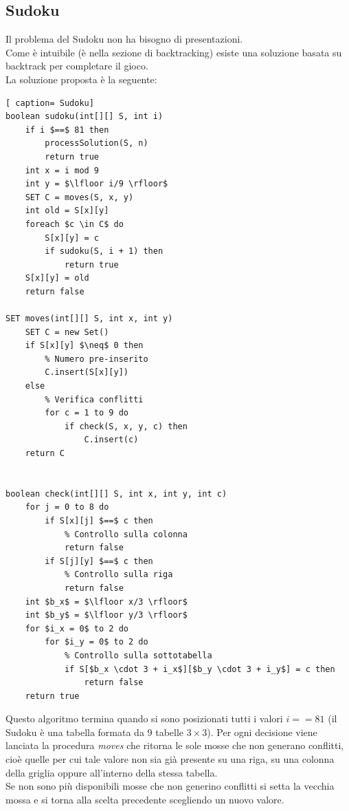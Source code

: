 \documentclass[../cheatSheetAlgoritmi.tex]{subfiles}
\begin{document}
\subsection{Sudoku}
Il problema del Sudoku non ha bisogno di presentazioni. \\
Come è intuibile (è nella sezione di backtracking) esiste una soluzione basata su backtrack per completare il gioco. \\
La soluzione proposta è la seguente: 
 \begin{lstlisting}[ caption= Sudoku]
boolean sudoku(int[][] S, int i)
	if i $==$ 81 then
		processSolution(S, n)
		return true
	int x = i mod 9
	int y = $\lfloor i/9 \rfloor$
	SET C = moves(S, x, y)
	int old = S[x][y]
	foreach $c \in C$ do
		S[x][y] = c
		if sudoku(S, i + 1) then
			return true
	S[x][y] = old
	return false
	
SET moves(int[][] S, int x, int y)
	SET C = new Set()
	if S[x][y] $\neq$ 0 then
		% Numero pre-inserito
		C.insert(S[x][y])
	else
		% Verifica conflitti
		for c = 1 to 9 do
			if check(S, x, y, c) then
				C.insert(c)
	return C
	
	
boolean check(int[][] S, int x, int y, int c)
	for j = 0 to 8 do
		if S[x][j] $==$ c then
			% Controllo sulla colonna
			return false
		if S[j][y] $==$ c then
			% Controllo sulla riga
			return false
	int $b_x$ = $\lfloor x/3 \rfloor$
	int $b_y$ = $\lfloor y/3 \rfloor$
	for $i_x = 0$ to 2 do
		for $i_y = 0$ to 2 do
			% Controllo sulla sottotabella
			if S[$b_x \cdot 3 + i_x$][$b_y \cdot 3 + i_y$] = c then
				return false
	return true 
\end{lstlisting}
Questo algoritmo termina quando si sono posizionati tutti i valori $i == 81$ (il Sudoku è una tabella formata da 9 tabelle $3 \times 3$). 
Per ogni decisione viene lanciata la procedura \emph{moves} che ritorna le sole mosse che non generano conflitti, cioè quelle per cui tale valore non sia già presente su una riga, su una colonna della griglia oppure all'interno della stessa tabella. \\ Se non sono più disponibili mosse che non generino conflitti si setta la vecchia mossa e si torna alla scelta precedente scegliendo un nuovo valore.
\end{document}

